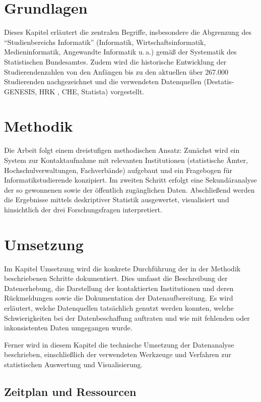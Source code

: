 \section{Grundlagen}

Dieses Kapitel erläutert die zentralen Begriffe, insbesondere die Abgrenzung des ``Studienbereichs Informatik'' (Informatik, Wirtschaftsinformatik, Medieninformatik, Angewandte Informatik u.\,a.) gemäß der Systematik des Statistischen Bundesamtes. Zudem wird die historische Entwicklung der Studierendenzahlen von den Anfängen bis zu den aktuellen über 267.000 Studierenden \cite{destatisStudierende2025} nachgezeichnet und die verwendeten Datenquellen (Destatis-GENESIS, HRK \cite{hrkStatistik2025}, CHE, Statista) vorgestellt.

\section{Methodik}

Die Arbeit folgt einem dreistufigen methodischen Ansatz: Zunächst wird ein System zur Kontaktaufnahme mit relevanten Institutionen (statistische Ämter, Hochschulverwaltungen, Fachverbände) aufgebaut und ein Fragebogen für Informatikstudierende konzipiert. Im zweiten Schritt erfolgt eine Sekundäranalyse der so gewonnenen sowie der öffentlich zugänglichen Daten. Abschließend werden die Ergebnisse mittels deskriptiver Statistik ausgewertet, visualisiert und hinsichtlich der drei Forschungsfragen interpretiert.

\section{Umsetzung}

Im Kapitel Umsetzung wird die konkrete Durchführung der in der Methodik beschriebenen Schritte dokumentiert. Dies umfasst die Beschreibung der Datenerhebung, die Darstellung der kontaktierten Institutionen und deren Rückmeldungen sowie die Dokumentation der Datenaufbereitung. Es wird erläutert, welche Datenquellen tatsächlich genutzt werden konnten, welche Schwierigkeiten bei der Datenbeschaffung auftraten und wie mit fehlenden oder inkonsistenten Daten umgegangen wurde.

Ferner wird in diesem Kapitel die technische Umsetzung der Datenanalyse beschrieben, einschließlich der verwendeten Werkzeuge und Verfahren zur statistischen Auswertung und Visualisierung.

\subsection{Zeitplan und Ressourcen}


